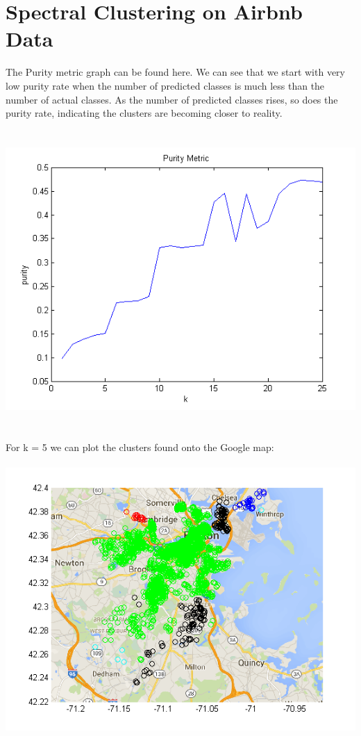 \documentclass[paper=a4, fontsize=11pt]{scrartcl} %
\numberwithin{equation}{section} %
\numberwithin{figure}{section} %
\numberwithin{table}{section} %
\begin{document}
	\newpage
	\section{Spectral Clustering on Airbnb Data}

	The Purity metric graph can be found here. We can see that we start with very low purity rate when the number of predicted classes is much less than the number of actual classes. As the number of predicted classes rises, so does the purity rate, indicating the clusters are becoming closer to reality.
	\\\\\\
	\hspace*{-1cm}\includegraphics[]{purity}
	\\\\\\
	For k = 5 we can plot the clusters found onto the Google map:
	\\\\
	\hspace*{-1cm}\includegraphics[]{google_map}
\end{document}
